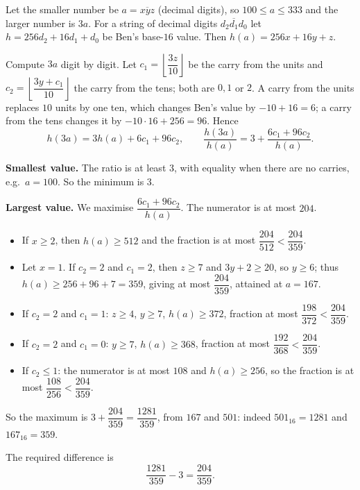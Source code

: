 Let the smaller number be $a=\overline{xyz}$ (decimal digits), so $100\le a\le 333$ and the larger number is $3a$. For a string of decimal digits $\overline{d_2d_1d_0}$ let $h=256d_2+16d_1+d_0$ be Ben's base-$16$ value. Then $h(a)=256x+16y+z$.

Compute $3a$ digit by digit. Let $c_1=\left\lfloor\dfrac{3z}{10}\right\rfloor$ be the carry from the units and $c_2=\left\lfloor\dfrac{3y+c_1}{10}\right\rfloor$ the carry from the tens; both are $0,1$ or $2$. A carry from the units replaces $10$ units by one ten, which changes Ben's value by $-10+16=6$; a carry from the tens changes it by $-10\cdot16+256=96$. Hence
\[
h(3a)=3h(a)+6c_1+96c_2,\qquad \dfrac{h(3a)}{h(a)}=3+\dfrac{6c_1+96c_2}{h(a)}.
\]

\textbf{Smallest value.} The ratio is at least $3$, with equality when there are no carries, e.g.\ $a=100$. So the minimum is $3$.

\textbf{Largest value.} We maximise $\dfrac{6c_1+96c_2}{h(a)}$. The numerator is at most $204$.
\begin{itemize}
\item If $x\ge2$, then $h(a)\ge512$ and the fraction is at most $\dfrac{204}{512}<\dfrac{204}{359}$.
\item Let $x=1$. If $c_2=2$ and $c_1=2$, then $z\ge7$ and $3y+2\ge20$, so $y\ge6$; thus $h(a)\ge256+96+7=359$, giving at most $\dfrac{204}{359}$, attained at $a=167$.
\item If $c_2=2$ and $c_1=1$: $z\ge4$, $y\ge7$, $h(a)\ge 372$, fraction at most $\dfrac{198}{372}<\dfrac{204}{359}$.
\item If $c_2=2$ and $c_1=0$: $y\ge7$, $h(a)\ge368$, fraction at most $\dfrac{192}{368}<\dfrac{204}{359}$.
\item If $c_2\le1$: the numerator is at most $108$ and $h(a)\ge256$, so the fraction is at most $\dfrac{108}{256}<\dfrac{204}{359}$.
\end{itemize}
So the maximum is $3+\dfrac{204}{359}=\dfrac{1281}{359}$, from $167$ and $501$: indeed $501_{16}=1281$ and $167_{16}=359$.

The required difference is
\[
\dfrac{1281}{359}-3=\boxed{\dfrac{204}{359}}.
\]
